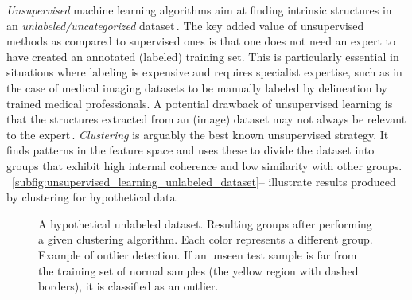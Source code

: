 \emph{Unsupervised} machine learning algorithms aim at finding intrinsic structures in an \emph{unlabeled/uncategorized} dataset\,\cite{Celebi-2016-Book-UnsupML}. The key added value of unsupervised methods as compared to supervised ones is that one does not need an expert to have created an annotated (labeled) training set. This is particularly essential in situations where labeling is expensive and requires specialist expertise, such as in the case of medical imaging datasets to be manually labeled by delineation by trained medical professionals. A potential drawback of unsupervised learning is that the structures extracted from an (image) dataset may not always be relevant to the expert\,\cite{Celebi-2016-Book-UnsupML}. \emph{Clustering} is arguably the best known unsupervised strategy. It finds patterns in the feature space and uses these to divide the dataset into groups that exhibit high internal coherence and low similarity with other groups. \hyperref[subfig:unsupervised_learning_unlabeled_dataset]{\figs}~\ref{subfig:unsupervised_learning_unlabeled_dataset}-- illustrate results produced by clustering for hypothetical data.

\begin{figure}[!t]
    \centering
    
    \caption[Unsupervised machine learning and outlier detection.]{ A hypothetical unlabeled dataset.  Resulting groups after performing a given clustering algorithm. Each color represents a different group.  Example of outlier detection. If an unseen test sample is far from the training set of normal samples (the yellow region with dashed borders), it is classified as an outlier.}
    \label{fig:unsupervised_learning}
\end{figure}



